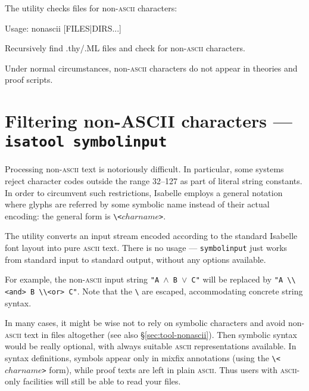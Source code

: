 The  utility checks files for non-\textsc{ascii} characters:
\begin{ttbox}
Usage: nonascii [FILES|DIRS...]

Recursively find .thy/.ML files and check for non-\textsc{ascii}
characters.
\end{ttbox}
Under normal circumstances, non-\textsc{ascii} characters do not appear in
theories and proof scripts.


\section{Filtering non-ASCII characters --- \texttt{isatool symbolinput}}
\label{sec:tool-symbolinput}

Processing non-\textsc{ascii} text is notoriously difficult.  In particular,
some {\ML} systems reject character codes outside the range 32--127 as part of
literal string constants. In order to circumvent such restrictions, Isabelle
employs a general notation where glyphs are referred by some symbolic name
instead of their actual encoding: the general form is
\verb|\<|$charname$\verb|>|.

The  utility converts an input stream encoded according to
the standard Isabelle font layout into pure \textsc{ascii} text. There is no
usage --- \texttt{symbolinput} just works from standard input to standard
output, without any options available.

\medskip For example, the non-\textsc{ascii} input string \texttt{"A $\land$ B
  $\lor$ C"} will be replaced by \verb|"A \\<and> B \\<or> C"|.  Note that the
\verb|\| are escaped, accommodating concrete {\ML} string syntax.

\medskip In many cases, it might be wise not to rely on symbolic characters
and avoid non-\textsc{ascii} text in files altogether (see also
\S\ref{sec:tool-nonascii}). Then symbolic syntax would be really optional,
with always suitable \textsc{ascii} representations available.  In syntax
definitions, symbols appear only in mixfix annotations (using the
\verb|\<|$charname$\verb|>| form), while proof texts are left in plain
\textsc{ascii}.  Thus users with \textsc{ascii}-only facilities will still be
able to read your files.

